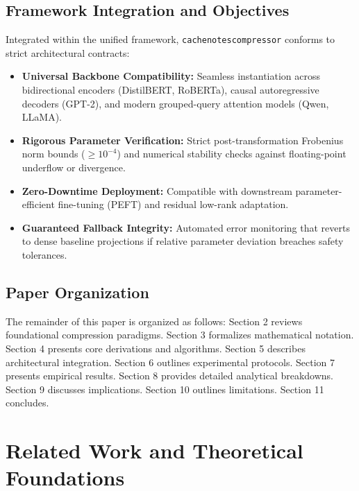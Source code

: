 \subsection{Framework Integration and Objectives}
Integrated within the unified framework, \texttt{cachenotescompressor} conforms to strict architectural contracts:
\begin{itemize}
\item \textbf{Universal Backbone Compatibility:} Seamless instantiation across bidirectional encoders (DistilBERT, RoBERTa), causal autoregressive decoders (GPT-2), and modern grouped-query attention models (Qwen, LLaMA).
\item \textbf{Rigorous Parameter Verification:} Strict post-transformation Frobenius norm bounds ($\ge 10^{-4}$) and numerical stability checks against floating-point underflow or divergence.
\item \textbf{Zero-Downtime Deployment:} Compatible with downstream parameter-efficient fine-tuning (PEFT) and residual low-rank adaptation.
\item \textbf{Guaranteed Fallback Integrity:} Automated error monitoring that reverts to dense baseline projections if relative parameter deviation breaches safety tolerances.
\end{itemize}

\subsection{Paper Organization}
The remainder of this paper is organized as follows: Section 2 reviews foundational compression paradigms. Section 3 formalizes mathematical notation. Section 4 presents core derivations and algorithms. Section 5 describes architectural integration. Section 6 outlines experimental protocols. Section 7 presents empirical results. Section 8 provides detailed analytical breakdowns. Section 9 discusses implications. Section 10 outlines limitations. Section 11 concludes.


\section{Related Work and Theoretical Foundations}

